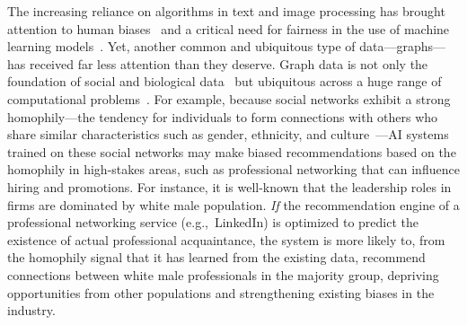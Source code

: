 \documentclass{article}
\theoremstyle{plain}
\theoremstyle{definition}
\theoremstyle{remark}
\begin{document}
The increasing reliance on algorithms in text and image processing has brought attention to human biases~\cite{10.1145/3442188.3445922} and a critical need for fairness in the use of machine learning models~\cite{DBLP:journals/corr/BolukbasiCZSK16a, bourliBiasKnowledgeGraph2020,GenderBiasWikipedia2022,GoogleFixesTranslate2018,pagesNikonCameraSays}.
Yet, another common and ubiquitous type of data---graphs---has received far less attention than they deserve.
Graph data is not only the foundation of social and biological data~\cite{newmanNetworks2018} but ubiquitous across a huge range of computational problems~\cite{Jumper2021HighlyAP, DBLP:journals/corr/abs-2108-11482, Mirhoseini2021AGP}. 
For example, because social networks exhibit a strong homophily---the tendency for individuals to form connections with others who share similar characteristics such as gender, ethnicity, and culture~\cite{doi:10.1080/0022250X.2012.744247}---AI systems trained on these social networks may make biased recommendations based on the homophily in high-stakes areas, such as professional networking that can influence hiring and promotions.
For instance, it is well-known that the leadership roles in firms are dominated by white male population. 
\emph{If} the recommendation engine of a professional networking service (e.g.,~LinkedIn) is optimized to predict the existence of actual professional acquaintance, the system is more likely to, from the homophily signal that it has learned from the existing data, recommend connections between white male professionals in the majority group, depriving opportunities from other populations and strengthening existing biases in the industry. 
\end{document}
